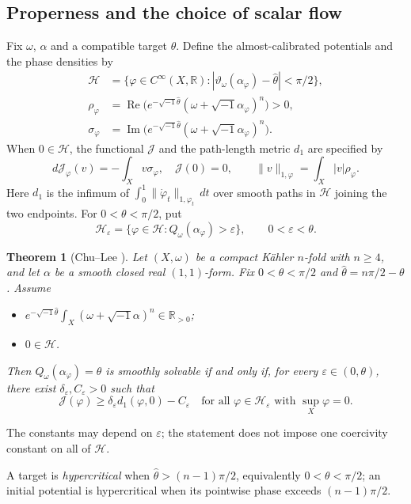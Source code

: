 \documentclass[12pt,reqno]{amsart}
\numberwithin{equation}{section}
\theoremstyle{plain}
\newtheorem{theorem}{Theorem}[section]
\theoremstyle{definition}
\newcommand{\cH}{\mathcal H}
\newcommand{\R}{\mathbb R}
\newcommand{\PropernessStatement}{%
Let $(X,\omega)$ be a compact K\"ahler $n$-fold with $n\geq4$, and
let $\alpha$ be a smooth closed real $(1,1)$-form. Fix
$0<\theta<\pi/2$ and $\widehat\theta=n\pi/2-\theta$. Assume
\begin{itemize}
\item $e^{-\sqrt{-1}\widehat\theta}\int_X(\omega+\sqrt{-1}\alpha)^n
\in\R_{>0}$;
\item $0\in\cH$.
\end{itemize}
Then $Q_\omega(\alpha_\varphi)=\theta$ is smoothly solvable if and
only if, for every $\varepsilon\in(0,\theta)$, there exist
$\delta_\varepsilon,C_\varepsilon>0$ such that
\[
 \mathcal J(\varphi)\geq\delta_\varepsilon d_1(\varphi,0)-C_\varepsilon
 \quad\text{for all }\varphi\in\cH_\varepsilon
 \text{ with }\sup_X\varphi=0.
\]
}
\begin{document}
\subsection{Properness and the choice of scalar flow}
\label{intro-properness-flows}
Fix $\omega$, $\alpha$ and a compatible target $\widehat\theta$.
Define the almost-calibrated potentials and the phase densities by
\begin{align*}
 \cH&=\{\varphi\in C^\infty(X,\R):
 |\vartheta_\omega(\alpha_\varphi)-\widehat\theta|<\pi/2\},\\
 \rho_\varphi&=\operatorname{Re}\bigl(e^{-\sqrt{-1}\widehat\theta}
                   (\omega+\sqrt{-1}\alpha_\varphi)^n\bigr)>0,\\
 \sigma_\varphi&=\operatorname{Im}\bigl(e^{-\sqrt{-1}\widehat\theta}
                   (\omega+\sqrt{-1}\alpha_\varphi)^n\bigr).
\end{align*}
When $0\in\cH$, the functional $\mathcal J$ and the path-length
metric $d_1$ are specified by
\[
 d\mathcal J_\varphi(v)=-\int_Xv\sigma_\varphi,
 \quad\mathcal J(0)=0,
 \qquad \|v\|_{1,\varphi}=\int_X|v|\rho_\varphi.
\]
Here $d_1$ is the infimum of $\int_0^1\|\dot\varphi_t\|_{1,\varphi_t}\,dt$
over smooth paths in $\cH$ joining the two endpoints.
For $0<\theta<\pi/2$, put
\[
 \cH_\varepsilon=\{\varphi\in\cH:
 Q_\omega(\alpha_\varphi)>\varepsilon\},\qquad 0<\varepsilon<\theta.
\]
\begin{theorem}[Chu--Lee {\cite[Theorem 1.4]{CL26}}]
\label{thm-properness}
\PropernessStatement
\end{theorem}
The constants may depend on $\varepsilon$; the statement does not impose
one coercivity constant on all of $\cH$.

A target is \emph{hypercritical} when
$\widehat\theta>(n-1)\pi/2$, equivalently $0<\theta<\pi/2$;
an initial potential is hypercritical when its pointwise phase exceeds
$(n-1)\pi/2$.
\end{document}
